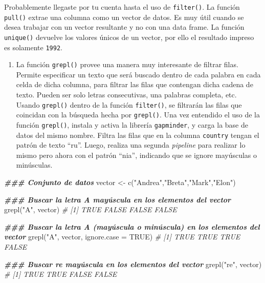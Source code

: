 \documentclass[
]{article}
\newenvironment{Shaded}{\begin{snugshade}}{\end{snugshade}}
\newcommand{\AttributeTok}[1]{\textcolor[rgb]{0.77,0.63,0.00}{#1}}
\newcommand{\CommentTok}[1]{\textcolor[rgb]{0.56,0.35,0.01}{\textit{#1}}}
\newcommand{\ConstantTok}[1]{\textcolor[rgb]{0.00,0.00,0.00}{#1}}
\newcommand{\DocumentationTok}[1]{\textcolor[rgb]{0.56,0.35,0.01}{\textbf{\textit{#1}}}}
\newcommand{\FunctionTok}[1]{\textcolor[rgb]{0.00,0.00,0.00}{#1}}
\newcommand{\NormalTok}[1]{#1}
\newcommand{\OtherTok}[1]{\textcolor[rgb]{0.56,0.35,0.01}{#1}}
\newcommand{\StringTok}[1]{\textcolor[rgb]{0.31,0.60,0.02}{#1}}
\providecommand{\tightlist}{%
  \setlength{\itemsep}{0pt}\setlength{\parskip}{0pt}}
\theoremstyle{definition}
\theoremstyle{definition}
\theoremstyle{definition}
\theoremstyle{definition}
\theoremstyle{remark}
\begin{document}
\begin{rmdnote}
Probablemente llegaste por tu cuenta hasta el uso de \texttt{filter()}. La función \texttt{pull()} extrae una columna como un vector de datos. Es muy útil cuando se desea trabajar con un vector resultante y no con una data frame. La función \texttt{unique()} devuelve los valores únicos de un vector, por ello el resultado impreso es solamente \texttt{1992}.
\end{rmdnote}

\begin{enumerate}
\def\labelenumi{\arabic{enumi}.}
\tightlist
\item
  La función \texttt{grepl()} provee una manera muy interesante de filtrar filas. Permite especificar un texto que será buscado dentro de cada palabra en cada celda de dicha columna, para filtrar las filas que contengan dicha cadena de texto. Pueden ser solo letras consecutivas, una palabras completa, etc. Usando \texttt{grepl()} dentro de la función \texttt{filter()}, se filtrarán las filas que coincidan con la búsqueda hecha por \texttt{grepl()}. Una vez entendido el uso de la función \texttt{grepl()}, instala y activa la librería \texttt{gapminder}, y carga la base de datos del mismo nombre. Filtra las filas que en la columna \texttt{country} tengan el patrón de texto ``ru''. Luego, realiza una segunda \emph{pipeline} para realizar lo mismo pero ahora con el patrón ``nia'', indicando que se ignore mayúsculas o minúsculas.
\end{enumerate}

\begin{Shaded}
\begin{Highlighting}[]
\DocumentationTok{\#\#\# Conjunto de datos}
\NormalTok{vector }\OtherTok{\textless{}{-}} \FunctionTok{c}\NormalTok{(}\StringTok{"Andrea"}\NormalTok{,}\StringTok{"Breta"}\NormalTok{,}\StringTok{"Mark"}\NormalTok{,}\StringTok{"Elon"}\NormalTok{)}

\DocumentationTok{\#\#\# Buscar la letra A mayúscula en los elementos del vector}
\FunctionTok{grepl}\NormalTok{(}\StringTok{"A"}\NormalTok{, vector)}
\CommentTok{\# [1]  TRUE FALSE FALSE FALSE}

\DocumentationTok{\#\#\# Buscar la letra A (mayúscula o minúscula) en los elementos del vector}
\FunctionTok{grepl}\NormalTok{(}\StringTok{"A"}\NormalTok{, vector, }\AttributeTok{ignore.case =} \ConstantTok{TRUE}\NormalTok{)}
\CommentTok{\# [1]  TRUE  TRUE  TRUE FALSE}

\DocumentationTok{\#\#\# Buscar re mayúscula en los elementos del vector}
\FunctionTok{grepl}\NormalTok{(}\StringTok{"re"}\NormalTok{, vector)}
\CommentTok{\# [1]  TRUE  TRUE FALSE FALSE}
\end{Highlighting}
\end{Shaded}
\end{document}

